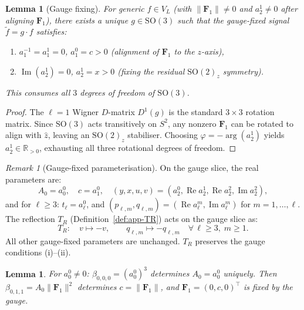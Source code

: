 \documentclass{article}
\newtheorem{lemma}[theorem]{Lemma}
\theoremstyle{definition}
\theoremstyle{remark}
\newtheorem{remark}[theorem]{Remark}
\DeclareMathOperator{\im}{Im}
\newcommand{\R}{\mathbb{R}}
\newcommand{\SO}{\mathrm{SO}}
\newcommand{\norm}[1]{\lVert #1 \rVert}
\theoremstyle{definition}
\begin{document}
\begin{lemma}[Gauge fixing]\label{lem:app-gauge}
For generic $f \in V_L$ (with $\norm{\mathbf{F}_1} \ne 0$ and $a_2^1 \ne 0$
after aligning $\mathbf{F}_1$), there exists a unique $g \in \SO(3)$ such that
the gauge-fixed signal $\tilde{f} = g \cdot f$ satisfies:
\begin{enumerate}[nosep,label=(\roman*)]
\item $a_1^{-1} = a_1^1 = 0$, \quad $a_1^0 = c > 0$ \quad
  (alignment of $\mathbf{F}_1$ to the $z$-axis),
\item $\im(a_2^1) = 0$, \quad $a_2^1 = x > 0$ \quad
  (fixing the residual $\SO(2)_z$ symmetry).
\end{enumerate}
This consumes all $3$ degrees of freedom of $\SO(3)$.
\end{lemma}
\begin{proof}
The $\ell=1$ Wigner $D$-matrix $D^1(g)$ is the standard $3 \times 3$
rotation matrix. Since $\SO(3)$ acts transitively on $S^2$, any nonzero
$\mathbf{F}_1$ can be rotated to align with $\hat{z}$, leaving an
$\SO(2)_z$ stabiliser. Choosing
$\varphi = -\arg(a_2^1)$ yields $a_2^1 \in \R_{>0}$, exhausting all
three rotational degrees of freedom.
\end{proof}

\begin{remark}[Gauge-fixed parameterisation]\label{rem:app-gauge-param}
On the gauge slice, the real parameters are:
\[
  A_0 = a_0^0, \quad c = a_1^0, \quad
  (y, x, u, v) = (a_2^0, \operatorname{Re}a_2^1, \operatorname{Re}a_2^2, \im a_2^2),
\]
and for $\ell \ge 3$: $t_\ell = a_\ell^0$, and
$(p_{\ell,m}, q_{\ell,m}) = (\operatorname{Re}a_\ell^m, \im a_\ell^m)$ for $m = 1,\ldots,\ell$.
The reflection $T_R$ (Definition~\ref{def:app-TR}) acts on the gauge slice as:
\begin{equation}\label{eq:app-TR-action}
  T_R: \quad v \mapsto -v, \qquad
  q_{\ell,m} \mapsto -q_{\ell,m} \quad \forall\, \ell \ge 3, \; m \ge 1.
\end{equation}
All other gauge-fixed parameters are unchanged.
$T_R$ preserves the gauge conditions (i)--(ii).
\end{remark}

\begin{lemma}\label{lem:app-F0F1}
For $a_0^0 \ne 0$:
$\beta_{0,0,0} = (a_0^0)^3$ determines $A_0 = a_0^0$ uniquely.
Then $\beta_{0,1,1} = A_0 \norm{\mathbf{F}_1}^2$ determines
$c = \norm{\mathbf{F}_1}$, and $\mathbf{F}_1 = (0, c, 0)^\top$
is fixed by the gauge.
\end{lemma}
\end{document}
